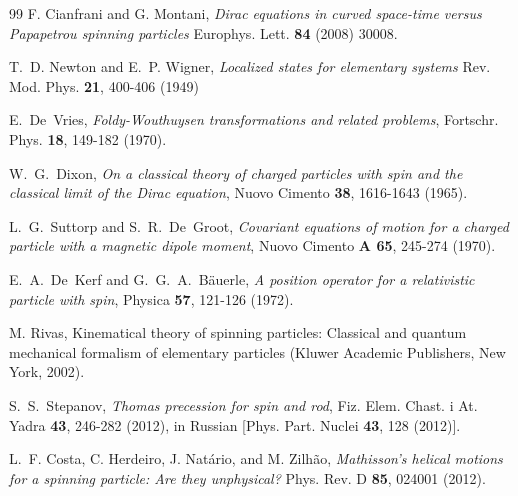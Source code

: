 \documentclass[preprint,showpacs,preprintnumbers,eqsecnum,amsmath,amssymb]{revtex4-1}
\begin{document}
\begin{thebibliography}{99}
F. Cianfrani and G. Montani,
{\it  Dirac equations in curved space-time versus Papapetrou spinning particles}
Europhys. Lett. {\bf 84} (2008) 30008. %

T.~D. Newton and E.~P. Wigner, {\it Localized states for elementary systems}
Rev. Mod. Phys. {\bf 21}, 400-406 (1949) %

E.~De~Vries,
{\it Foldy-Wouthuysen transformations and related problems},
Fortschr. Phys. {\bf 18}, 149-182 (1970). %

W.~G.~Dixon, {\it On a classical theory of charged particles with spin and the classical
limit of the Dirac equation},
Nuovo Cimento {\bf 38}, 1616-1643 (1965). %

L.~G.~Suttorp and S.~R.~De~Groot, {\it Covariant equations of motion for a charged
particle with a magnetic dipole moment},
Nuovo Cimento {\bf A 65}, 245-274 (1970). %

E.~A.~De~Kerf and G.~G.~A.~B\"auerle,
{\it A position operator for a relativistic particle with spin},
Physica {\bf 57}, 121-126 (1972). %

M. Rivas, Kinematical theory of spinning particles: Classical and quantum mechanical
formalism of elementary particles (Kluwer Academic Publishers, New York, 2002).

S.~S.~Stepanov, {\it Thomas precession for spin and rod},
Fiz. Elem. Chast. i At. Yadra {\bf 43}, 246-282 (2012), in Russian
[Phys. Part. Nuclei {\bf 43}, 128 (2012)].

L.~F. Costa, C. Herdeiro, J. Nat\'ario, and M. Zilh\~ao,
{\it Mathisson's helical motions for a spinning particle: Are they unphysical?}
Phys. Rev. D {\bf 85}, 024001 (2012). %


\end{thebibliography}
\end{document}
